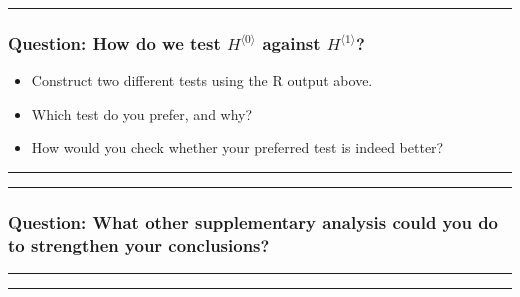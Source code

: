 \documentclass[]{article}
\begin{document}
\begin{center}\rule{0.5\linewidth}{\linethickness}\end{center}

\subsubsection{\texorpdfstring{Question: How do we test
\(H^{\langle 0\rangle}\) against
\(H^{\langle 1\rangle}\)?}{Question: How do we test H\^{}\{\textbackslash{}langle 0\textbackslash{}rangle\} against H\^{}\{\textbackslash{}langle 1\textbackslash{}rangle\}?}}\label{question-how-do-we-test-hlangle-0rangle-against-hlangle-1rangle}

\begin{itemize}
\item
  Construct two different tests using the R output above.
\item
  Which test do you prefer, and why?
\item
  How would you check whether your preferred test is indeed better?
\end{itemize}

\begin{center}\rule{0.5\linewidth}{\linethickness}\end{center}

\begin{center}\rule{0.5\linewidth}{\linethickness}\end{center}

\subsubsection{Question: What other supplementary analysis could you do
to strengthen your
conclusions?}\label{question-what-other-supplementary-analysis-could-you-do-to-strengthen-your-conclusions}
\begin{center}\rule{0.5\linewidth}{\linethickness}\end{center}

\begin{center}\rule{0.5\linewidth}{\linethickness}\end{center}
\end{document}
